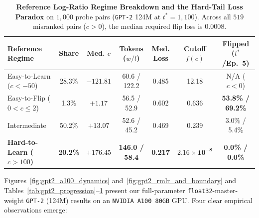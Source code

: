 \documentclass[11pt]{article}
\theoremstyle{plain}
\theoremstyle{definition}
\begin{document}
\begin{table}[t]
  \centering
  \caption{\textbf{Reference Log-Ratio Regime Breakdown and the Hard-Tail Loss Paradox} on $1{,}000$ probe pairs (\texttt{GPT-2} 124M at $t^* = 1{,}100$). Across all $519$ misranked pairs ($c > 0$), the median required flip loss is $0.0008$.}
  \label{tab:gpt2_probe_slices}
  \footnotesize
  \renewcommand{\arraystretch}{1.16}
  \setlength{\tabcolsep}{2.2pt}
  \begin{tabular*}{\textwidth}{@{\extracolsep{\fill}}lcccccc@{}}
    \toprule
    \textbf{Reference Regime} & \textbf{Share} & \shortstack{\textbf{Med.}\\\textbf{$c$}} & \shortstack{\textbf{Tokens}\\\textbf{($w / l$)}} & \shortstack{\textbf{Med.}\\\textbf{Loss}} & \shortstack{\textbf{Cutoff}\\\textbf{$f(c)$}} & \shortstack{\textbf{Flipped}\\\textbf{($t^*$/Ep.\ 5)}} \\
    \midrule
    Easy-to-Learn ($c < -50$) & 28.3\% & $-121.81$ & 60.6 / 122.2 & 0.485 & 12.18 & N/A ($c < 0$) \\
    Easy-to-Flip ($0 < c \le 2$) & 1.3\% & $+1.17$ & 56.5 / 52.9 & 0.602 & 0.636 & \textbf{53.8\% / 69.2\%} \\
    Intermediate & 50.2\% & $+13.07$ & 52.6 / 45.2 & 0.469 & 0.239 & 3.0\% / 5.4\% \\
    \textbf{Hard-to-Learn ($c > 100$)} & \textbf{20.2\%} & $\boldsymbol{+176.45}$ & \textbf{146.0 / 58.4} & \textbf{0.217} & $\boldsymbol{2.16 \times 10^{-8}}$ & \textbf{0.0\% / 0.0\%} \\
    \bottomrule
  \end{tabular*}
\end{table}

Figures~\ref{fig:gpt2_a100_dynamics} and~\ref{fig:gpt2_rmlr_and_boundary} and Tables~\ref{tab:gpt2_progression}--\ref{tab:gpt2_probe_slices} present our full-parameter \texttt{float32}-master-weight \texttt{GPT-2} (124M) results on an \texttt{NVIDIA A100 80GB} GPU. Four clear empirical observations emerge:
\end{document}
